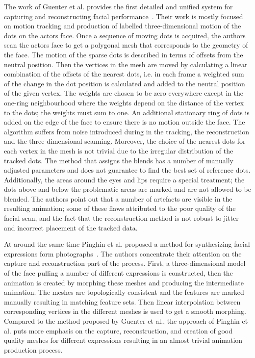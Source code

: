 \documentclass[11pt]{report}
\begin{document}
The work of Guenter et al. provides the first detailed and unified system for capturing and reconstructing facial performance~\cite{Guenter:1998}. Their work is mostly focused on motion tracking and production of labelled three-dimensional motion of the dots on the actors face. Once a sequence of  moving dots is acquired, the authors scan the actors face to get a polygonal mesh that corresponds to the geometry of the face. The motion of the sparse dots is described in terms of offsets from the neutral position. Then the vertices in the mesh are moved by calculating a linear combination of the offsets of the nearest dots, i.e. in each frame a weighted sum of the change in the dot position is calculated and added to the neutral position of the given vertex. The weights are chosen to be zero everywhere except in the one-ring neighbourhood where the weights depend on the distance of the vertex to the dots; the weights must sum to one. An additional stationary ring of dots is added on the edge of the face to ensure there is no motion outside the face. The algorithm suffers from noise introduced during in the tracking, the reconstruction and the three-dimensional scanning. Moreover, the choice of the nearest dots for each vertex in the mesh is not trivial due to the irregular distribution of the tracked dots. The method that assigns the blends has a number of manually adjusted parameters and does not guarantee to find the best set of reference dots. Additionally, the areas around the eyes and lips require a special treatment; the dots above and below the problematic areas are marked and are not allowed to be blended. The authors point out that a number of artefacts are visible in the resulting animation; some of these flaws attributed to the poor quality of the facial scan, and the fact that the reconstruction method is not robust to jitter and  incorrect placement of the tracked data.

At around the same time Pinghin et al. proposed a method for synthesizing facial expressions form photographs~\cite{Pighin:1998}. The authors concentrate their attention on the capture and reconstruction part of the process. First, a three-dimensional model of the face pulling a number of different expressions is constructed, then the animation is created by morphing these meshes and producing the intermediate animation. The meshes are topologically consistent and the features are marked manually resulting in matching feature sets. Then linear interpolation between corresponding vertices in the different meshes is used to get a smooth morphing. Compared to the method proposed by Guenter et al., the approach of Pinghin et al. puts more emphasis on the capture, reconstruction, and creation of good quality meshes for different expressions resulting in an almost trivial animation production process.
\end{document}
